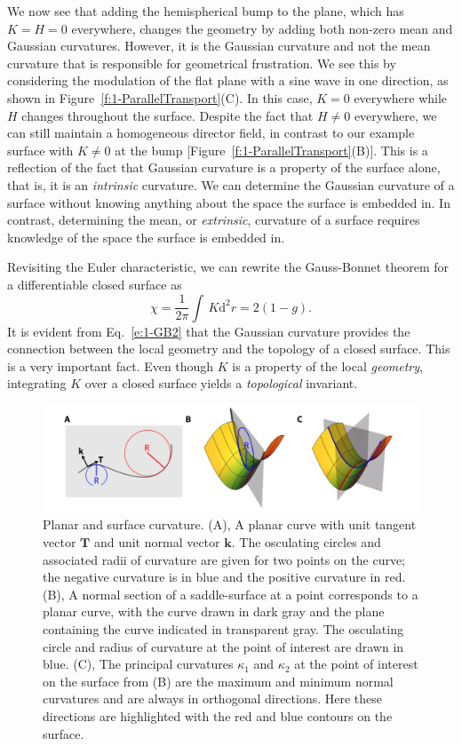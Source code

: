 We now see that adding the hemispherical bump to the plane, which has $K = H = 0$ everywhere, changes the geometry by adding both non-zero mean and Gaussian curvatures.
However, it is the Gaussian curvature and not the mean curvature that is responsible for geometrical frustration.
We see this by considering the modulation of the flat plane with a sine wave in one direction, as shown in Figure~\ref{f:1-ParallelTransport}(C).
In this case, $K=0$ everywhere while $H$ changes throughout the surface.
Despite the fact that $H \neq 0$ everywhere, we can still maintain a homogeneous director field, in contrast to our example surface with $K \neq 0$ at the bump [Figure~\ref{f:1-ParallelTransport}(B)].
This is a reflection of the fact that Gaussian curvature is a property of the surface alone, that is, it is an \textit{intrinsic} curvature.
We can determine the Gaussian curvature of a surface without knowing anything about the space the surface is embedded in.
In contrast, determining the mean, or \textit{extrinsic}, curvature of a surface requires knowledge of the space the surface is embedded in.

Revisiting the Euler characteristic, we can rewrite the Gauss-Bonnet theorem for a differentiable closed surface as
\begin{equation}
  \chi = \frac{1}{2 \pi} \int \, K \textrm{d}^2r = 2(1-g)\label{e:1-GB2}.
\end{equation}
It is evident from Eq.~\ref{e:1-GB2} that the Gaussian curvature provides the connection between the local geometry and the topology of a closed surface.
This is a very important fact.
Even though $K$ is a property of the local \textit{geometry}, integrating $K$ over a closed surface yields a \textit{topological} invariant.
\begin{figure}
  \centering
  \includegraphics{figures/C1/Ch1-Figs_Curvature.png}
  \caption{Planar and surface curvature.
  (A), A planar curve with unit tangent vector $\mathbf{T}$ and unit normal vector $\mathbf{k}$. The osculating circles and associated radii of curvature are given for two points on the curve; the negative curvature is in blue and the positive curvature in red.
  (B), A normal section of a saddle-surface at a point corresponds to a planar curve, with the curve drawn in dark gray and the plane containing the curve indicated in transparent gray.
  The osculating circle and radius of curvature at the point of interest are drawn in blue.
  (C), The principal curvatures $\kappa_1$ and $\kappa_2$ at the point of interest on the surface from (B) are the maximum and minimum normal curvatures and are always in orthogonal directions. Here these directions are highlighted with the red and blue contours on the surface.}\label{f:1-Curvature}
\end{figure}

